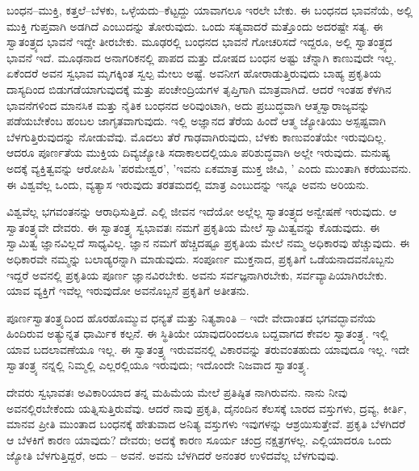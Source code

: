 ಬಂಧನ–ಮುಕ್ತಿ, ಕತ್ತಲೆ–ಬೆಳಕು, ಒಳ್ಳೆಯದು–ಕೆಟ್ಟದ್ದು ಯಾವಾಗಲೂ ಇರಲೇ ಬೇಕು. ಈ ಬಂಧನದ ಭಾವನೆಯೆ, ಅಲ್ಲಿ ಮುಕ್ತಿ ಗುಪ್ತವಾಗಿ ಅಡಗಿದೆ ಎಂಬುದನ್ನು ತೋರುವುದು. ಒಂದು ಸತ್ಯವಾದರೆ ಮತ್ತೊಂದು ಅದರಷ್ಟೇ ಸತ್ಯ. ಈ ಸ್ವಾತಂತ್ರ್ಯದ ಭಾವನೆ ಇದ್ದೇ ತೀರಬೇಕು. ಮೂಢರಲ್ಲಿ ಬಂಧನದ ಭಾವನೆ ಗೋಚರಿಸದೆ ಇದ್ದರೂ, ಅಲ್ಲಿ ಸ್ವಾತಂತ್ರ್ಯದ ಭಾವನೆ ಇದೆ. ಮೂಢನಾದ ಅನಾಗರಿಕನಲ್ಲಿ ಪಾಪದ ಮತ್ತು ದೋಷದ ಬಂಧನ ಅಷ್ಟು ಚೆನ್ನಾಗಿ ಕಾಣುವುದೇ ಇಲ್ಲ. ಏಕೆಂದರೆ ಅವನ ಸ್ವಭಾವ ಮೃಗಕ್ಕಿಂತ ಸ್ವಲ್ಪ ಮೇಲು ಅಷ್ಟೆ. ಅವನೀಗ ಹೋರಾಡುತ್ತಿರುವುದು ಬಾಹ್ಯ ಪ್ರಕೃತಿಯ ದಾಸ್ಯದಿಂದ ಬಿಡುಗಡೆಯಾಗುವುದಕ್ಕೆ ಮತ್ತು ಪಂಚೇಂದ್ರಿಯಗಳ ತೃಪ್ತಿಗಾಗಿ ಮಾತ್ರವಾಗಿದೆ. ಆದರೆ ಇಂತಹ ಕೆಳಗಿನ ಭಾವನೆಗಳಿಂದ ಮಾನಸಿಕ ಮತ್ತು ನೈತಿಕ ಬಂಧನದ ಅರಿವುಂಟಾಗಿ, ಅದು ಪ್ರಬುದ್ಧವಾಗಿ ಆತ್ಮಸ್ವಾರಾಜ್ಯವನ್ನು ಪಡೆಯಬೇಕೆಂಬ ಹಂಬಲ ಜಾಗೃತವಾಗುವುದು. ಇಲ್ಲಿ ಅಜ್ಞಾನದ ತೆರೆಯ ಹಿಂದೆ ಆತ್ಮ ಜ್ಯೋತಿಯು ಅಸ್ಪಷ್ಟವಾಗಿ ಬೆಳಗುತ್ತಿರುವುದನ್ನು ನೋಡುವೆವು. ಮೊದಲು ತೆರೆ ಗಾಢವಾಗಿರುವುದು, ಬೆಳಕು ಕಾಣುವಂತೆಯೇ ಇರುವುದಿಲ್ಲ. ಆದರೂ ಪೂರ್ಣತೆಯ ಮುಕ್ತಿಯ ದಿವ್ಯಜ್ಯೋತಿ ಸದಾಕಾಲದಲ್ಲಿಯೂ ಪರಿಶುದ್ಧವಾಗಿ ಅಲ್ಲೇ ಇರುವುದು. ಮನುಷ್ಯ ಅದಕ್ಕೆ ವ್ಯಕ್ತಿತ್ವವನ್ನು ಆರೋಪಿಸಿ 'ಪರಮೇಶ್ವರ', 'ಇವನು ಏಕಮಾತ್ರ ಮುಕ್ತ ಜೀವಿ, ' ಎಂದು ಮುಂತಾಗಿ ಕರೆಯುವನು. ಈ ವಿಶ್ವವೆಲ್ಲ ಒಂದು, ವ್ಯತ್ಯಾಸ ಇರುವುದು ತರತಮದಲ್ಲಿ ಮಾತ್ರ ಎಂಬುದನ್ನು ಇನ್ನೂ ಅವನು ಅರಿಯನು.

ವಿಶ್ವವೆಲ್ಲ ಭಗವಂತನನ್ನು ಆರಾಧಿಸುತ್ತಿದೆ. ಎಲ್ಲಿ ಜೀವನ ಇದೆಯೋ ಅಲ್ಲೆಲ್ಲ ಸ್ವಾತಂತ್ರ್ಯದ ಅನ್ವೇಷಣೆ ಇರುವುದು. ಆ ಸ್ವಾತಂತ್ರ್ಯವೇ ದೇವರು. ಈ ಸ್ವಾತಂತ್ರ್ಯ ಸ್ವಭಾವತಃ ನಮಗೆ ಪ್ರಕೃತಿಯ ಮೇಲೆ ಸ್ವಾಮಿತ್ವವನ್ನು ಕೊಡುವುದು. ಈ ಸ್ವಾಮಿತ್ವ ಜ್ಞಾನವಿಲ್ಲದೆ ಸಾಧ್ಯವಿಲ್ಲ. ಜ್ಞಾನ ನಮಗೆ ಹೆಚ್ಚಿದಷ್ಟೂ ಪ್ರಕೃತಿಯ ಮೇಲೆ ನಮ್ಮ ಅಧಿಕಾರವು ಹೆಚ್ಚುವುದು. ಈ ಅಧಿಕಾರವೇ ನಮ್ಮನ್ನು ಬಲಾಡ್ಯರನ್ನಾಗಿ ಮಾಡುವುದು. ಸಂಪೂರ್ಣ ಮುಕ್ತನಾದ, ಪ್ರಕೃತಿಗೆ ಒಡೆಯನಾದವನೊಬ್ಬನು ಇದ್ದರೆ ಅವನಲ್ಲಿ ಪ್ರಕೃತಿಯ ಪೂರ್ಣ ಜ್ಞಾನವಿರಬೇಕು. ಅವನು ಸರ್ವಜ್ಞನಾಗಿರಬೇಕು, ಸರ್ವವ್ಯಾಪಿಯಾಗಿರಬೇಕು. ಯಾವ ವ್ಯಕ್ತಿಗೆ ಇವೆಲ್ಲ ಇರುವುದೋ ಅವನೊಬ್ಬನೆ ಪ್ರಕೃತಿಗೆ ಅತೀತನು.

ಪೂರ್ಣಸ್ವಾತಂತ್ರ್ಯದಿಂದ ಹೊರಹೊಮ್ಮುವ ಧನ್ಯತೆ ಮತ್ತು ನಿತ್ಯಶಾಂತಿ – ಇದೇ ವೇದಾಂತದ ಭಗವದ್ಭಾವನೆಯ ಹಿಂದಿರುವ ಅತ್ಯುನ್ನತ ಧಾರ್ಮಿಕ ಕಲ್ಪನೆ. ಈ ಸ್ಥಿತಿಯೇ ಯಾವುದರಿಂದಲೂ ಬದ್ದವಾಗದ ಕೇವಲ ಸ್ವಾತಂತ್ರ್ಯ. ಇಲ್ಲಿ ಯಾವ ಬದಲಾವಣೆಯೂ ಇಲ್ಲ. ಈ ಸ್ವಾತಂತ್ರ್ಯ ಇರುವವನಲ್ಲಿ ವಿಕಾರವನ್ನು ತರುವಂತಹುದು ಯಾವುದೂ ಇಲ್ಲ. ಇದೇ ಸ್ವಾತಂತ್ರ್ಯ ನನ್ನಲ್ಲಿ ನಿಮ್ಮಲ್ಲಿ ಎಲ್ಲರಲ್ಲಿಯೂ ಇರುವುದು; ಇದೊಂದೇ ನಿಜವಾದ ಸ್ವಾತಂತ್ರ್ಯ.

ದೇವರು ಸ್ವಭಾವತಃ ಅವಿಕಾರಿಯಾದ ತನ್ನ ಮಹಿಮೆಯ ಮೇಲೆ ಪ್ರತಿಷ್ಠಿತ ನಾಗಿರುವನು. ನಾನು ನೀವು ಅವನಲ್ಲಿರಬೇಕೆಂದು ಯತ್ನಿಸುತ್ತಿರುವೆವು. ಆದರೆ ನಾವು ಪ್ರಕೃತಿ, ದೈನಂದಿನ ಕೆಲಸಕ್ಕೆ ಬಾರದ ವಸ್ತುಗಳು, ದ್ರವ್ಯ, ಕೀರ್ತಿ, ಮಾನವ ಪ್ರೀತಿ ಮುಂತಾದ ಬಂಧನಕ್ಕೆ ಹೇತುವಾದ ಅನಿತ್ಯ ವಸ್ತುಗಳು ಇವುಗಳನ್ನು ಆಶ್ರಯಿಸುತ್ತೇವೆ. ಪ್ರಕೃತಿ ಬೆಳಗಿದರೆ ಆ ಬೆಳಕಿಗೆ ಕಾರಣ ಯಾವುದು? ದೇವರು; ಅದಕ್ಕೆ ಕಾರಣ ಸೂರ್ಯ ಚಂದ್ರ ನಕ್ಷತ್ರಗಳಲ್ಲ. ಎಲ್ಲಿಯಾದರೂ ಒಂದು ಜ್ಯೋತಿ ಬೆಳಗುತ್ತಿದ್ದರೆ, ಅದು – ಅವನೆ. ಅವನು ಬೆಳಗಿದರೆ ಅನಂತರ ಉಳಿದವೆಲ್ಲ ಬೆಳಗುವುವು.

